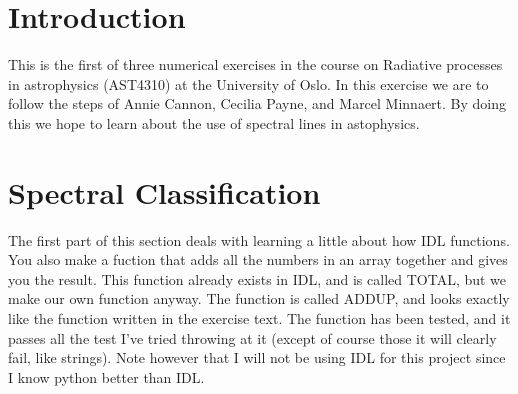 \documentclass{aa}   %
\begin{document}
  



\section{Introduction}   \label{sec:Intro}
This is the first of three numerical exercises in the course on Radiative processes in astrophysics (AST4310) at the University of Oslo. In this exercise we are to follow the steps of Annie Cannon, Cecilia Payne, and Marcel Minnaert. By doing this we hope to learn about the use of spectral lines in astophysics. 


\section{Spectral Classification}    \label{sec:Specclas}
The first part of this section deals with learning a little about how IDL functions.
You also make a fuction that adds all the numbers in an array together and gives you the result.
This function already exists in IDL, and is called TOTAL, but we make our own function anyway.
The function is called ADDUP, and looks exactly like the function written in the exercise text.
The function has been tested, and it passes all the test I've tried throwing at it (except of course those it will clearly fail, like strings). Note however that I will not be using IDL for this project since I know python better than IDL.
\end{document}
